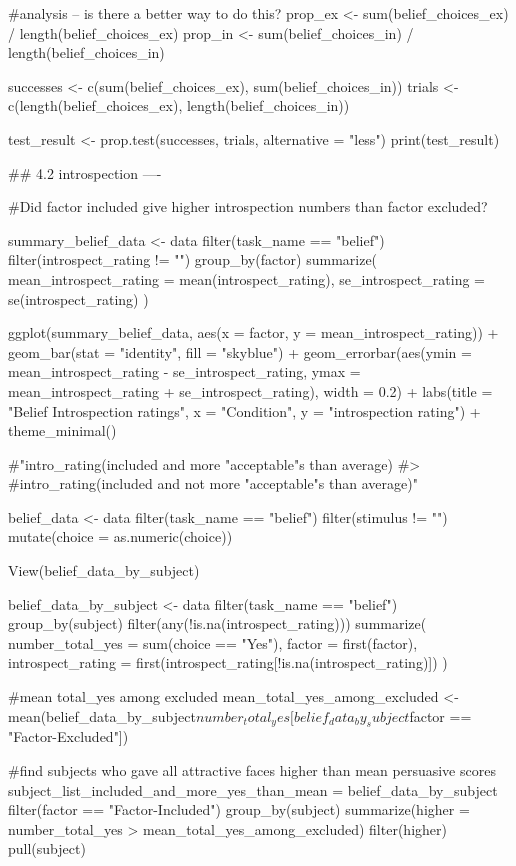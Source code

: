 \documentclass{article}
\begin{document}
#analysis -- is there a better way to do this?
prop_ex <- sum(belief_choices_ex) / length(belief_choices_ex)
prop_in <- sum(belief_choices_in) / length(belief_choices_in)

successes <- c(sum(belief_choices_ex), sum(belief_choices_in))
trials <- c(length(belief_choices_ex), length(belief_choices_in))

test_result <- prop.test(successes, trials, alternative = "less")
print(test_result)


    ## 4.2 introspection ----

#Did factor included give higher introspection numbers than factor excluded?

summary_belief_data <- data %
  filter(task_name == "belief") %
  filter(introspect_rating != "") %
  group_by(factor) %
  summarize(
    mean_introspect_rating = mean(introspect_rating),
    se_introspect_rating = se(introspect_rating)
  )

ggplot(summary_belief_data, aes(x = factor, y = mean_introspect_rating)) +
  geom_bar(stat = "identity", fill = "skyblue") +
  geom_errorbar(aes(ymin = mean_introspect_rating - se_introspect_rating, ymax = mean_introspect_rating + se_introspect_rating), width = 0.2) +
  labs(title = "Belief Introspection ratings", x = "Condition", y = "introspection rating") +
  theme_minimal()

#"intro_rating(included and more "acceptable"s than average)
#>
#intro_rating(included and not more "acceptable"s than average)"

belief_data <- data %
  filter(task_name == "belief") %
  filter(stimulus != "") %
  mutate(choice = as.numeric(choice))

View(belief_data_by_subject)

belief_data_by_subject <- data %
  filter(task_name == "belief") %
  group_by(subject) %
  filter(any(!is.na(introspect_rating))) %
  summarize(
    number_total_yes = sum(choice == "Yes"),
    factor = first(factor),
    introspect_rating = first(introspect_rating[!is.na(introspect_rating)])
  )

#mean total_yes among excluded
mean_total_yes_among_excluded <- mean(belief_data_by_subject$number_total_yes[belief_data_by_subject$factor == "Factor-Excluded"])

#find subjects who gave all attractive faces higher than mean persuasive scores
subject_list_included_and_more_yes_than_mean = belief_data_by_subject %
  filter(factor == "Factor-Included") %
  group_by(subject) %
  summarize(higher = number_total_yes > mean_total_yes_among_excluded) %
  filter(higher) %
  pull(subject)
\end{document}
